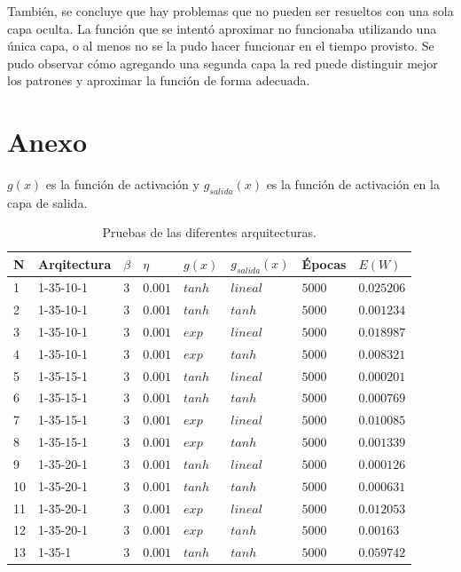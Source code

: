 \documentclass[11pt,a4paper]{article}
\begin{document}
También, se concluye que hay problemas que no pueden ser resueltos con una sola capa oculta. La función que se intentó aproximar no funcionaba utilizando una única capa, o al menos no se la pudo hacer funcionar en el tiempo provisto. Se pudo observar cómo agregando una segunda capa la red puede distinguir mejor los patrones y aproximar la función de forma adecuada.
 
\clearpage
\appendix
\renewcommand{\figurename}{Figura}
\section{Anexo}

$g(x)$ es la función de activación y $g_{salida}(x)$ es la función de activación en la capa de salida.

{\begin{table}[ht]
\centering
\begin{tabular}{|l|l|l|l|l|l|l|l|}
\hline
N  & Arqitectura & $\beta$ & $\eta$   & $g(x)$ & $g_{salida}(x)$ & Épocas & $E(W)$     \\ \hline
1  & 1-35-10-1    & $3$   & $0.001$ & $tanh$ & $lineal$      & $5000$   & $0.025206$ \\ \hline
2  & 1-35-10-1    & $3$    & $0.001$ & $tanh$ & $tanh$        & $5000$  & $0.001234$ \\ \hline
3  & 1-35-10-1    & $3$   & $0.001$ & $exp$  & $lineal$      & $5000$   & $0.018987$ \\ \hline
4  & 1-35-10-1    & $3$    & $0.001$ & $exp$  & $tanh$        & $5000$   & $0.008321$ \\ \hline
5  & 1-35-15-1    & $3$    & $0.001$ & $tanh$ & $lineal$      & $5000$   & $0.000201$ \\ \hline
6  & 1-35-15-1    & $3$    & $0.001$ & $tanh$ & $tanh$        & $5000$   & $0.000769$ \\ \hline
7  & 1-35-15-1    & $3$   & $0.001$ & $exp$  & $lineal$      & $5000$   & $0.010085$ \\ \hline
8  & 1-35-15-1    & $3$    & $0.001$ & $exp$  & $tanh$        & $5000$   & $0.001339$ \\ \hline
9  & 1-35-20-1    & $3$    & $0.001$ & $tanh$ & $lineal$      & $5000$   & $0.000126$ \\ \hline
10 & 1-35-20-1    & $3$   & $0.001$ & $tanh$ & $tanh$        & $5000$   & $0.000631$ \\ \hline
11 & 1-35-20-1    & $3$    & $0.001$ & $exp$  & $lineal$      & $5000$   & $0.012053$ \\ \hline
12 & 1-35-20-1    & $3$    & $0.001$ & $exp$  & $tanh$        & $5000$   & $0.00163$  \\ \hline
13 & 1-35-1    & $3$    & $0.001$ & $tanh$  & $tanh$        & $5000$   & $0.059742$  \\ \hline
\end{tabular}
\caption{Pruebas de las diferentes arquitecturas.}
\label{table:pruebaArqs} 
\end{table}

}
\end{document}
